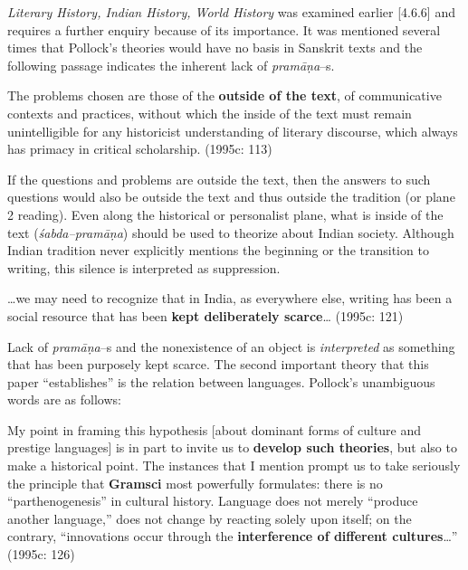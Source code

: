 \textit{Literary History, Indian History, World History }was examined earlier [4.6.6] and requires a further enquiry because of its importance. It was mentioned several times that Pollock’s theories would have no basis in Sanskrit texts and the following passage indicates the inherent lack of \textit{pramāṇa}–s.

\begin{myquote}
The problems chosen are those of the \textbf{outside of the text}, of communicative contexts and practices, without which the inside of the text must remain unintelligible for any historicist understanding of literary discourse, which always has primacy in critical scholarship. (1995c: 113)
\end{myquote}

If the questions and problems are outside the text, then the answers to such questions would also be outside the text and thus outside the tradition (or plane 2 reading). Even along the historical or personalist plane, what is inside of the text (\textit{śabda–pramāṇa}) should be used to theorize about Indian society. Although Indian tradition never explicitly mentions the beginning or the transition to writing, this silence is interpreted as suppression.

\begin{myquote}
…we may need to recognize that in India, as everywhere else, writing has been a social resource that has been \textbf{kept deliberately scarce}… (1995c: 121)
\end{myquote}

Lack of \textit{pramāṇa}–s and the nonexistence of an object is \textit{interpreted} as something that has been purposely kept scarce. The second important theory that this paper “establishes” is the relation between languages. Pollock’s unambiguous words are as follows:

\begin{myquote}
My point in framing this hypothesis [about dominant forms of culture and prestige languages] is in part to invite us to \textbf{develop such theories}, but also to make a historical point. The instances that I mention prompt us to take seriously the principle that\textbf{ Gramsci }most powerfully formulates: there is no “parthenogenesis” in cultural history. Language does not merely “produce another language,” does not change by reacting solely upon itself; on the contrary, “innovations occur through the \textbf{interference of different cultures}…” (1995c: 126)
\end{myquote}

